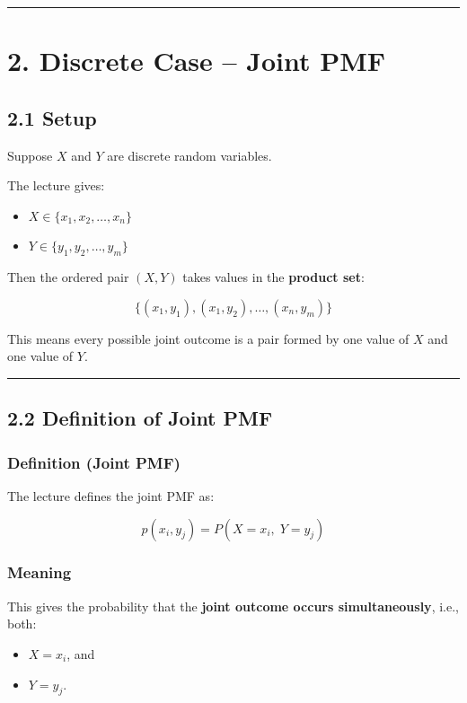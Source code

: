 \documentclass[12pt]{article}
\begin{document}
\hrule
\vspace{1em}

\section*{2. Discrete Case – Joint PMF}

\subsection*{2.1 Setup}

Suppose \(X\) and \(Y\) are discrete random variables.

The lecture gives:

\begin{itemize}
    \item \(X \in \{x_1, x_2, \dots, x_n\}\)
    \item \(Y \in \{y_1, y_2, \dots, y_m\}\)
\end{itemize}

Then the ordered pair \((X,Y)\) takes values in the \textbf{product set}:

\[
\{(x_1,y_1),(x_1,y_2),\dots,(x_n,y_m)\}
\]

This means every possible joint outcome is a pair formed by one value of \(X\) and one value of \(Y\).

\hrule
\vspace{1em}

\subsection*{2.2 Definition of Joint PMF}

\subsubsection*{Definition (Joint PMF)}

The lecture defines the joint PMF as:

\[
p(x_i,y_j)=P(X=x_i,\;Y=y_j)
\]

\subsubsection*{Meaning}

This gives the probability that the \textbf{joint outcome occurs simultaneously}, i.e., both:

\begin{itemize}
    \item \(X=x_i\), and
    \item \(Y=y_j\).
\end{itemize}
\end{document}
